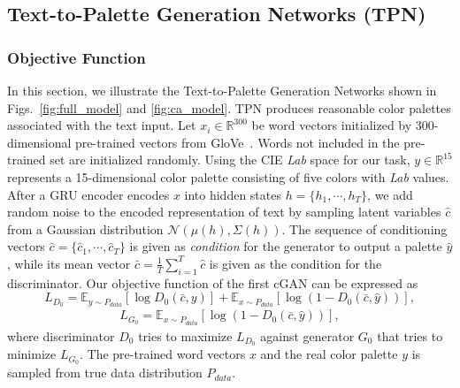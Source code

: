 \documentclass[runningheads]{llncs}
\begin{document}
\subsection{Text-to-Palette Generation Networks (TPN)}
\label{sec:TPN}
\subsubsection{Objective Function}
In this section, we illustrate the Text-to-Palette Generation Networks shown in Figs.~\ref{fig:full_model} and \ref{fig:ca_model}. TPN produces reasonable color palettes associated with the text input. Let $x_{i}\in\mathbb{R}^{300}$ be word vectors initialized by 300-dimensional pre-trained vectors from GloVe~\cite{pennington2014glove}.
Words not included in the pre-trained set are initialized
randomly. Using the CIE \emph{Lab} space for our task, $y\in\mathbb{R}^{15}$
represents a 15-dimensional color palette consisting of five colors with \emph{Lab}
values. After a GRU encoder encodes $x$ into hidden states $h=\{h_{1},\cdots,h_{T}\}$, we add random noise to the encoded representation of text by sampling latent variables $\hat{c}$ from a Gaussian distribution $\mathcal{N}(\mu(h),\Sigma(h))$. The sequence of conditioning vectors $\hat{c}=\{\hat{c}_{1},\cdots,\hat{c}_{T}\}$ is given as \textit{condition} for the generator to output a palette $\hat{y}$, while its mean vector $\bar{c}=\frac{1}{T}{\sum_{i=1}^{T}\hat{c}}$ is given as the condition for the discriminator. Our objective function of the first cGAN can be expressed as 
\begin{equation}
L_{D_{0}}=\mathbb{E_{\mathit{y\sim P_{data}}}}[\log D_{0}(\bar{c},y)]+\mathbb{E_{\mathrm{\mathit{x\sim P_{data}}}}\mathrm{[\log(1-\mathit{D_{0}}(\mathit{\bar{c},\hat{y}}))],}}
\end{equation}
\begin{equation}
\begin{aligned}
L_{G_{0}}=\mathbb{E_{\mathit{x\sim P_{data}}}}[\log(1-\mathit{D}_{0}(\mathit{\bar{c},\hat{y}}))],
\end{aligned}
\end{equation}
where discriminator ${D}_{0}$ tries to maximize $L_{D_{0}}$ against generator $G_{0}$ that tries to minimize $L_{G_{0}}$. The pre-trained word vectors $x$ and the real color palette $y$ is sampled from true data distribution $P_{data}$.
\end{document}
